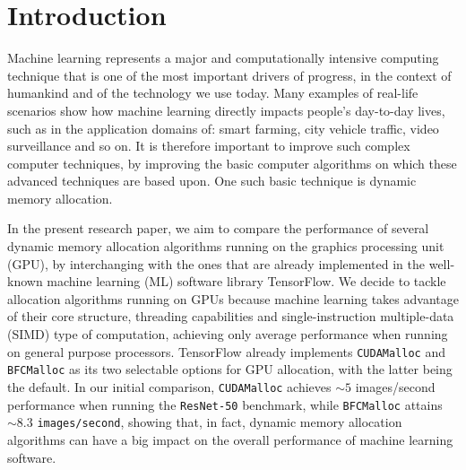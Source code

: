 \documentclass[12pt,twoside]{article}
\begin{document}
\clearpage




\section{Introduction}
\label{sect:introduction}


Machine learning represents a major and computationally intensive computing technique that is one of the most important drivers of progress, in the context of humankind and of the technology we use today. Many examples of real-life scenarios show how machine learning directly impacts people's day-to-day lives, such as in the application domains of: smart farming\todo[inline]{[1 TODO]}, city vehicle traffic\todo[inline]{[2 TODO]}, video surveillance and so on. It is therefore important to improve such complex computer techniques, by improving the basic computer algorithms on which these advanced techniques are based upon. One such basic technique is dynamic memory allocation.

In the present research paper, we aim to compare the performance of several dynamic memory allocation algorithms running on the graphics processing unit (GPU), by interchanging with the ones that are already implemented in the well-known machine learning (ML) software library TensorFlow. We decide to tackle allocation algorithms running on GPUs because machine learning takes advantage of their core structure, threading capabilities and single-instruction multiple-data (SIMD) type of computation, achieving only average performance when running on general purpose processors. TensorFlow already implements \texttt{CUDAMalloc} and \texttt{BFCMalloc} as its two selectable options for GPU allocation, with the latter being the default. In our initial comparison, \texttt{CUDAMalloc} achieves ${\sim}5$ images/second performance when running the \texttt{ResNet-50} benchmark, while \texttt{BFCMalloc} attains ${\sim}8.3$ \texttt{images/second}, showing that, in fact, dynamic memory allocation algorithms can have a big impact on the overall performance of machine learning software.
\end{document}
